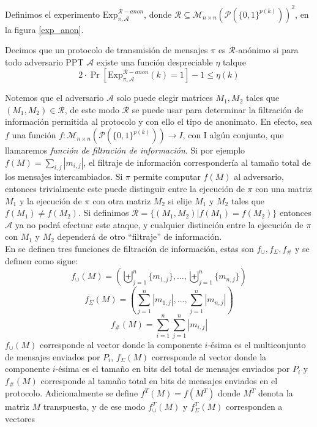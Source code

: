 Definimos el experimento $\mathrm{Exp}_{\pi, \mathcal{A}}^{\mathcal{R}-anon}$, donde
$\mathcal{R} \subseteq \mathcal{M}_{n \times n}(\mathcal{P}(\{0,1\}^{p(k)}))^2$, en la figura \ref{exp_anon}.

\begin{definicion}
Decimos que un protocolo de transmisión de mensajes $\pi$ es $\mathcal{R}$-anónimo si para todo
adversario PPT $\mathcal{A}$ existe una función despreciable $\eta$ talque
$$2\cdot\Pr[\mathrm{Exp}_{\pi, \mathcal{A}}^{\mathcal{R}-anon}(k) = 1] - 1 \leq \eta(k)$$
\end{definicion}

Notemos que el adversario $\mathcal{A}$ solo puede elegir matrices $M_1, M_2$ tales que
$(M_1, M_2) \in \mathcal{R}$, de este modo $\mathcal{R}$ se puede usar para determinar la filtración
de información permitida al protocolo y con ello el tipo de anonimato. En efecto,
sea $f$ una función $f:\mathcal{M}_{n \times n}(\mathcal{P}(\{0,1\}^{p(k)})) \to I$, con I algún conjunto,
que llamaremos \textit{función de filtración de información}. 
Si por ejemplo $f(M) = \sum_{i, j} |m_{i,j}|$, el filtraje de información
correspondería al tamaño total de los mensajes intercambiados.
Si $\pi$ permite computar $f(M)$ al adversario, entonces trivialmente este puede distinguir
entre la ejecución de $\pi$ con una matriz $M_1$ y la ejecución de $\pi$ con otra matriz $M_2$
si elije $M_1$ y $M_2$ tales que $f(M_1) \neq f(M_2)$. Si definimos
$\mathcal{R} =  \{(M_1, M_2)| f(M_1) = f(M_2)\}$ entonces $\mathcal{A}$ ya no podrá efectuar este ataque,
y cualquier distinción entre la ejecución  de $\pi$ con $M_1$ y  $M_2$ dependerá de otro ``filtraje''
de información.\\
En \cite{conf/pet/HeviaM08} se definen tres funciones de filtración de información, estas son
$f_{\cup}, f_{\Sigma}, f_{\#}$ y se definen como sigue:
$$f_\cup(M) = \left(\biguplus_{j=1}^n \{m_{1,j}\}, \ldots, \biguplus_{j=1}^n \{m_{n,j}\}\right)$$
$$f_\Sigma(M) = \left(\sum_{j=1}^n |m_{1,j}|, \ldots, \sum_{j=1}^n |m_{n,j}|\right)$$
$$f_\#(M) = \sum_{i=1}^n \sum_{j=1}^n |m_{i,j}|$$
$f_\cup(M)$ corresponde al vector donde la componente $i$-ésima es el multiconjunto de mensajes
enviados por $P_i$, $f_\Sigma(M)$ corresponde al vector donde la componente $i$-ésima es el tamaño
en bits del total de mensajes enviados por $P_i$ y $f_\#(M)$ corresponde al tamaño total en bits
de mensajes enviados en el protocolo. Adicionalmente se define $f^T(M) = f(M^T)$ donde $M^T$ denota
la matriz $M$ transpuesta, y de ese modo $f^T_\cup(M)$ y $f^T_\Sigma(M)$ corresponden a vectores
